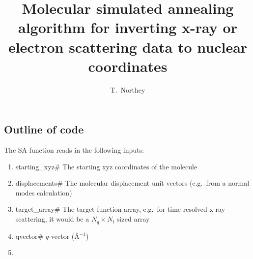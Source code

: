 \documentclass[]{article}
\title{Molecular simulated annealing algorithm for inverting x-ray or electron scattering data to nuclear coordinates}
\author{T.\ Northey}
\begin{document}
\maketitle

\begin{abstract}

\end{abstract}

\section{}

\subsection{Outline of code}

The SA function reads in the following inputs:

\begin{enumerate}
	\item starting\_xyz\quad \# The starting xyz coordinates of the molecule
	\item displacements\quad \# The molecular displacement unit vectors (e.g.\ from a normal modes calculation)
	\item target\_array\quad \# The target function array, e.g.\ for time-resolved x-ray scattering, it would be a $N_q \times N_t$ sized array
	\item qvector\quad \# $q$-vector (\AA$^{-1}$)
	\item 
\end{enumerate}
\end{document}
